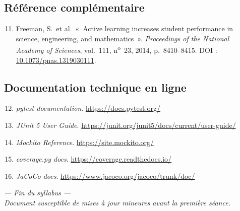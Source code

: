 \documentclass[11pt,a4paper]{article}
\begin{document}
\subsection{Référence complémentaire}

\begin{enumerate}\setcounter{enumi}{10}
    \item Freeman, S.\ et al.\ «~Active learning increases student performance in science, engineering, and mathematics~». \emph{Proceedings of the National Academy of Sciences}, vol.~111, n\textsuperscript{o}~23, 2014, p.~8410--8415. DOI : \href{https://doi.org/10.1073/pnas.1319030111}{10.1073/pnas.1319030111}.
\end{enumerate}

\subsection{Documentation technique en ligne}

\begin{enumerate}\setcounter{enumi}{11}
    \item \emph{pytest documentation}. \url{https://docs.pytest.org/}
    \item \emph{JUnit 5 User Guide}. \url{https://junit.org/junit5/docs/current/user-guide/}
    \item \emph{Mockito Reference}. \url{https://site.mockito.org/}
    \item \emph{coverage.py docs}. \url{https://coverage.readthedocs.io/}
    \item \emph{JaCoCo docs}. \url{https://www.jacoco.org/jacoco/trunk/doc/}
\end{enumerate}

\vspace{1em}
\begin{center}
\color{textsoft}\small\itshape
--- Fin du syllabus ---\\
Document susceptible de mises à jour mineures avant la première séance.
\end{center}
\end{document}
